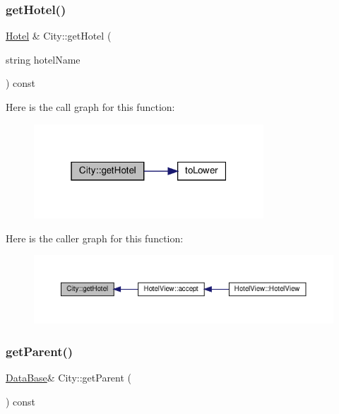 \subsubsection{\texorpdfstring{get\+Hotel()}{getHotel()}}
{\footnotesize\ttfamily \hyperlink{class_hotel}{Hotel} \& City\+::get\+Hotel (\begin{DoxyParamCaption}\item[{string}]{hotel\+Name }\end{DoxyParamCaption}) const}

Here is the call graph for this function\+:\nopagebreak
\begin{figure}[H]
\begin{center}
\leavevmode
\includegraphics[width=244pt]{class_city_a1215390b5e3b11dc19abeedcb096b720_cgraph}
\end{center}
\end{figure}
Here is the caller graph for this function\+:\nopagebreak
\begin{figure}[H]
\begin{center}
\leavevmode
\includegraphics[width=350pt]{class_city_a1215390b5e3b11dc19abeedcb096b720_icgraph}
\end{center}
\end{figure}
\mbox{\label{class_city_a77c96bacad3ab36d48811749f7ae6c82}} 
\subsubsection{\texorpdfstring{get\+Parent()}{getParent()}}
{\footnotesize\ttfamily \hyperlink{class_data_base}{Data\+Base}\& City\+::get\+Parent (\begin{DoxyParamCaption}{ }\end{DoxyParamCaption}) const\hspace{0.3cm}{\ttfamily [inline]}}

